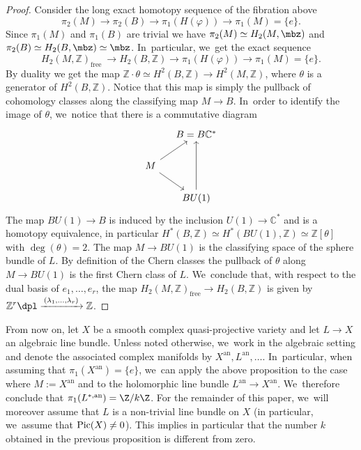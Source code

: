 \documentclass[JEP,XML,SOM,Unicode,published]{cedram}
\newcommand{\To}[1]{\mathchoice{\xrightarrow{\textstyle\kern4pt#1\kern3pt}}{\xrightarrow{\,#1\,}}{}{}}
\let\ra\rightarrow
\begin{document}
\begin{proof}
Consider the long exact homotopy sequence of the fibration above
\[
\pi_2(M) \to \pi_2(B) \to \pi_1(H(\varphi)) \to \pi_1(M)= \{e\}.
\]
Since $\pi_1(M)$ and $\pi_1(B)$ are trivial we have $\pi_2(M) \simeq H_2(M,\mbz)$ and $\pi_2(B) \simeq H_2(B,\mbz) \simeq \mbz$. In~particular, we~get the exact sequence
\[
H_2(M,\mathbb{Z})_{\text{free}}\ \to H_2(B,\mathbb{Z}) \to \pi_1(H(\varphi)) \to \pi_1(M) = \{e\}.
\]
By duality we get the map $\mathbb{Z} \cdot \theta \simeq H^2(B,\mathbb{Z}) \ra H^2(M,\mathbb{Z})$, where $\theta$ is a generator of $H^2(B,\mathbb{Z})$. Notice that this map is simply the pullback of cohomology classes along the classifying map $M \ra B$. In~order to identify the image of $\theta$, we~notice that there is a commutative diagram
\[
\begin{tikzcd}[column sep=small]
& B = B\mathbb{C}^* \\
M \arrow[ur] \arrow[dr] & \\
& BU(1) \arrow[uu]
\end{tikzcd}
\]
The map $BU(1) \to B$ is induced by the inclusion $U(1) \to \mathbb{C}^*$ and is a homotopy equivalence, in particular $H^*(B, \mathbb{Z}) \simeq H^*(BU(1),\mathbb{Z}) \simeq \mathbb{Z}[\theta]$ with $\deg(\theta) = 2$. The map $M \to BU(1)$ is the classifying space of the sphere bundle of $L$. By definition of the Chern classes the pullback of $\theta$ along $M \to BU(1)$ is the first Chern class of $L$. We~conclude that, with respect to the dual basis of $e_1,\ldots, e_r$, the map $H_2(M,\mathbb{Z})_{\text{free}} \to H_2(B,\mathbb{Z})$ is given by $\mathbb{Z}^r \dpl\To{\scriptstyle(\lambda_1, \ldots, \lambda_r)} \mathbb{Z}$.
\end{proof}

From now on, let $X$ be a smooth complex quasi-projective variety and let $L \to X$ an algebraic line bundle. Unless noted otherwise, we~work in the algebraic setting and denote the associated complex manifolds by $X^\mathrm{an}, L^\mathrm{an},\dots$. In~particular, when assuming that $\pi_1(X^\mathrm{an})=\{e\}$, we~can apply the above proposition to the case where $M:=X^\mathrm{an}$ and to the holomorphic line bundle $L^\mathrm{an}\to X^\mathrm{an}$. We~therefore conclude that $\pi_1(L^{*,\mathrm{an}})=\Z/k\Z$. For the remainder of this paper, we~will moreover assume that $L$ is a non-trivial line bundle on $X$ (in particular, we~assume that $\textup{Pic}(X)\neq 0$). This implies in particular that the number $k$ obtained in the previous proposition is different from zero.
\end{document}
